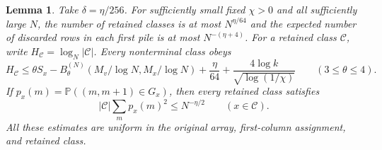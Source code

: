 \documentclass[11pt]{article}
\numberwithin{equation}{section}
\newtheorem{lemma}[theorem]{Lemma}
\theoremstyle{definition}
\theoremstyle{remark}
\newcommand{\Pp}{\mathbb P}
\newcommand{\1}{\mathbf 1}
\begin{document}
\begin{lemma}%
\label{lem:upper-classes}
Take $\delta=\eta/256$. For sufficiently small fixed $\chi>0$ and
all sufficiently large $N$, the number of retained classes is at most
$N^{\eta/64}$ and the expected number of discarded rows in each
first pile is at most $N^{-(\eta+4)}$.
For a retained class $\mathcal C$, write
$H_{\mathcal C}=\log_N|\mathcal C|$. Every nonterminal class obeys
\begin{equation}\label{eq:upper-class-entropy}
 H_{\mathcal C}\le\theta S_x-B^{(N)}_\theta(M_v/\log N,M_x/\log N)
       +\frac{\eta}{64}
       +\frac{4\log k}{\sqrt{\log(1/\chi)}}
       \qquad(3\le\theta\le4).
\end{equation}
If $p_x(m)=\Pp((m,m+1)\in G_x)$, then every retained class satisfies
\begin{equation}\label{eq:upper-class-density}
 |\mathcal C|\sum_m p_x(m)^2\le N^{-\eta/2}
                  \qquad(x\in\mathcal C).
\end{equation}
All these estimates are uniform in the original array, first-column
assignment, and retained class.
\end{lemma}
\end{document}
